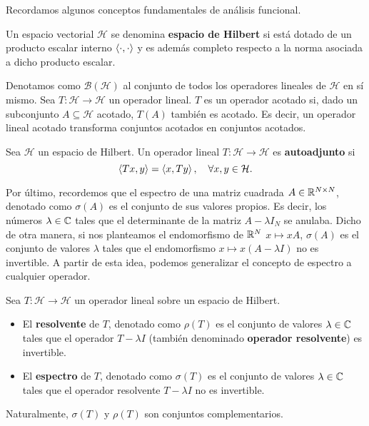     Recordamos algunos conceptos fundamentales de análisis funcional.

    \begin{definicion}
        Un espacio vectorial $\mathcal{H}$ se denomina \textbf{espacio de Hilbert} si está dotado de un producto escalar interno $\left\langle \cdot , \cdot \right\rangle$ y es además completo respecto a la norma asociada a dicho producto escalar.
    \end{definicion}

    Denotamos como $\mathcal{B}(\mathcal{H})$ al conjunto de todos los operadores lineales de $\mathcal{H}$ en sí mismo. Sea $T:\mathcal H \longrightarrow \mathcal{H}$ un operador lineal. $T$ es un operador acotado si, dado un subconjunto $A\subseteq \mathcal{H}$ acotado, $T(A)$ también es acotado. Es decir, un operador lineal acotado transforma conjuntos acotados en conjuntos acotados. 


    \begin{definicion}
        Sea $\mathcal{H}$ un espacio de Hilbert. Un operador lineal $T:\mathcal H \longrightarrow \mathcal{H}$ es \textbf{autoadjunto} si
        \begin{equation}
            \label{eq:operador-autoadjunto}
            \left\langle Tx , y \right\rangle = \left\langle x , Ty \right\rangle, \ \ \ \forall x,y\in \mathcal H.
        \end{equation}
    \end{definicion}

    Por último, recordemos que el espectro de una matriz cuadrada $A\in\mathbb{R}^{N\times N}$, denotado como $\sigma(A)$ es el conjunto de sus valores propios. Es decir, los números $\lambda\in\mathbb{C}$ tales que el determinante de la matriz $A-\lambda I_N$ se anulaba. Dicho de otra manera, si nos planteamos el endomorfismo de $\mathbb{R}^N$ $x\mapsto xA$, $\sigma(A)$ es el conjunto de valores $\lambda$ tales que el endomorfismo $x\mapsto x(A-\lambda I)$ no es invertible. A partir de esta idea, podemos generalizar el concepto de espectro a cualquier operador.
    
    \begin{definicion}
        Sea $T:\mathcal H \longrightarrow \mathcal{H}$ un operador lineal sobre un espacio de Hilbert. 
        \begin{itemize}
            \item El \textbf{resolvente} de $T$, denotado como $\rho(T)$ es el conjunto de valores $\lambda\in\mathbb{C}$ tales que el operador $T-\lambda I$ (también denominado \textbf{operador resolvente}) es invertible.
            \item El \textbf{espectro} de $T$, denotado como $\sigma(T)$ es el conjunto de valores $\lambda\in\mathbb{C}$ tales que el operador resolvente $T-\lambda I$ no es invertible.
        \end{itemize}
        Naturalmente, $\sigma(T)$ y $\rho(T)$ son conjuntos complementarios.
    \end{definicion}

